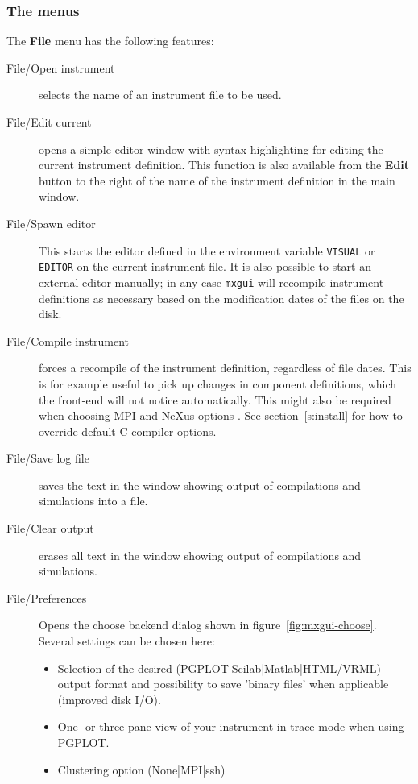 \subsubsection{The menus}

The {\bfseries File} menu has the following features:
\begin{description}
\item[File/Open instrument] selects the name of an instrument file to be used.
\item[File/Edit current] opens a simple editor window with \MCX  syntax
  highlighting for editing the
  current instrument definition. This function is also available from
  the {\bfseries Edit} button to the right of the name of the instrument definition in
  the main window.
\item[File/Spawn editor] This starts the editor defined in the environment
  variable \verb+VISUAL+ or \verb+EDITOR+ on the current instrument
  file. It is also possible to start an external editor manually; in any
  case \verb+mxgui+ will recompile instrument definitions as necessary based on
  the modification dates of the files on the disk.
\item[File/Compile instrument] forces a recompile of the instrument
  definition, regardless of file dates. This is for example useful to
  pick up changes in component definitions, which the front-end will not
  notice automatically. This might also be required when choosing MPI  and NeXus options . See section~\ref{s:install} for how to override
  default C compiler options.
\item[File/Save log file] saves the text in the window showing output of
  compilations and simulations into a file.
\item[File/Clear output] erases all text in the window showing output of
  compilations and simulations.
  \item[File/Preferences] Opens the choose backend dialog shown in
  figure~\ref{fig:mxgui-choose}. Several settings can be chosen here:
\begin{itemize}
  \item Selection of  the desired (PGPLOT|Scilab|Matlab|HTML/VRML) output
    format and possibility to save 'binary files' when
  applicable (improved disk I/O).
  \item One- or three-pane view of your instrument in trace mode when
    using PGPLOT.
  \item Clustering option (None|MPI|ssh)

\end{itemize}
\end{description}
